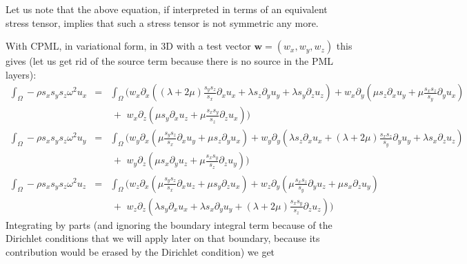 \documentclass[onecolumn,extra]{gji_modified_cours_UPPA}
\begin{document}
\noindent Let us note that the above equation, if interpreted in terms of an equivalent stress tensor, implies that such a stress tensor is not symmetric any more.


\clearpage

\noindent
With CPML, in variational form, in 3D with a test vector $\mathbf{w} = (w_x,w_y,w_z)$ this gives
(let us get rid of the source term because there is no source in the PML layers):
%
\begin{eqnarray}
%
\int_\Omega -\rho s_x s_y s_z \omega^2 u_x & = & \int_\Omega \Bigg( w_x \partial_x ((\lambda + 2 \mu)\frac{s_y s_z}{s_x}\partial_x u_x + \lambda s_z \partial_y u_y + \lambda s_y \partial_z u_z)
+ w_x \partial_y (\mu s_z \partial_x u_y + \mu \frac{s_x s_z}{s_y} \partial_y u_x) \nonumber  \\
&\,& \,+\,\, w_x \partial_z (\mu s_y \partial_x u_z + \mu \frac{s_x s_y}{s_z}\partial_z u_x)\Bigg) \nonumber \\
%
\int_\Omega -\rho s_x s_y s_z \omega^2 u_y  & = & \int_\Omega \Bigg( w_y \partial_x (\mu \frac{s_y s_z}{s_x} \partial_x u_y + \mu s_z \partial_y u_x )
+ w_y \partial_y (\lambda s_z \partial_x u_x + (\lambda + 2 \mu)\frac{s_x s_z}{s_y}\partial_y u_y + \lambda s_x \partial_z u_z)\nonumber \\
&\,& \,+\,\, w_y \partial_z ( \mu s_x \partial_y u_z + \mu \frac{s_x s_y}{s_z} \partial_z u_y) \Bigg) \nonumber \\
%
\int_\Omega - \rho s_x s_y s_z \omega^2 u_z  & = & \int_\Omega \Bigg( w_z \partial_x ( \mu \frac{s_y s_z}{s_x} \partial_x u_z + \mu s_y \partial_z u_x )
+ w_z \partial_y ( \mu \frac{s_x s_z}{s_y} \partial_y u_z + \mu s_x \partial_z u_y ) \nonumber \\
&\,& \,+\,\, w_z \partial_z ( \lambda s_y\partial_x u_x + \lambda s_x \partial_y u_y + (\lambda + 2 \mu)\frac{s_x s_y}{s_z}\partial_z u_z)\Bigg)
\end{eqnarray}
%
Integrating by parts (and ignoring the boundary integral term because of the Dirichlet conditions that we will apply
later on that boundary, because its contribution would be erased by the Dirichlet condition) we get
%
\end{document}
